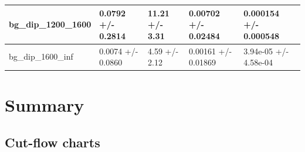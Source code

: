 \documentclass[a4paper, 10pt]{article}
\begin{document}
\begin{table}[H]
\begin{center}
\begin{tabular}{|m{20.0mm}|m{27.0mm}|m{27.0mm}|m{33.0mm}|m{32.0mm}|}
      \hline
      {\cellcolor{white}         bg\_dip\_1200\_1600}& {\cellcolor{white}         0.0792 +/\-- 0.2814}& {\cellcolor{white}         11.21 +/\-- 3.31}& {\cellcolor{white}         0.00702 +/\-- 0.02484}& {\cellcolor{white}         0.000154 +/\-- 0.000548}\\
      \hline
      {\cellcolor{white}         bg\_dip\_1600\_inf}& {\cellcolor{white}         0.0074 +/\-- 0.0860}& {\cellcolor{white}         4.59 +/\-- 2.12}& {\cellcolor{white}         0.00161 +/\-- 0.01869}& {\cellcolor{white}         3.94e-05 +/\-- 4.58e-04}\\
\hline
    \end{tabular}
  \end{center}
\end{table}

\newpage
\section{ Summary}

\subsection{Cut-flow charts}
\end{document}
